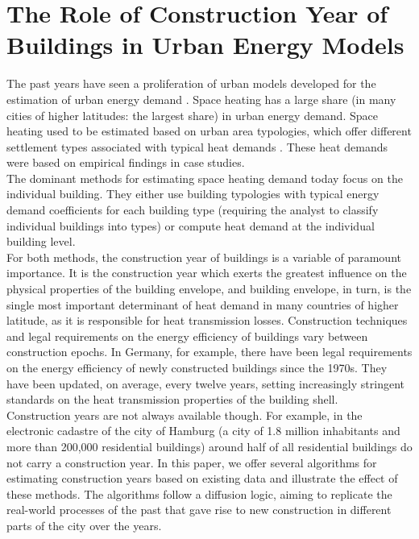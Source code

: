 \section{The Role of Construction Year of Buildings in Urban Energy Models}
 
The past years have seen a proliferation of urban models developed for the
estimation of urban energy demand
\cite{Calderon.2015,Mata.2014,MunozH.2014.IBPSA-JP,MunozH.2014.IJM,Chingcuanco.2012,Fracastoro.2011}.
Space heating has a large share (in many cities of higher latitudes: the
largest share) in urban energy demand. Space heating used to be estimated based
on urban area typologies, which offer different settlement types associated
with typical heat demands 
\cite{Roth.1980,Roth.1981,Blesl.2002,Everding.2004,Blesl.2007,Genske.2009,Erhorn.2011}.
These heat demands were based on empirical findings in case studies.\\
 
The dominant methods for estimating space heating demand today focus on the
individual building. They either use building typologies with typical energy
demand coefficients for each building type (requiring the analyst to classify
individual buildings into types) or compute heat demand at the individual
building level.\\
 
For both methods, the construction year of buildings is a variable of paramount
importance. It is the construction year which exerts the greatest influence on
the physical properties of the building envelope, and building envelope, in
turn, is the single most important determinant of heat demand in many countries
of higher latitude, as it is responsible for heat transmission losses.
Construction techniques and legal requirements on the energy efficiency of
buildings vary between construction epochs. In Germany, for example, there have
been legal requirements on the energy efficiency of newly constructed buildings
since the 1970s. They have been updated, on average, every twelve years,
setting increasingly stringent standards on the heat transmission properties of
the building shell.\\
 
Construction years are not always available though. For example, in the
electronic cadastre of the city of Hamburg (a city of 1.8 million inhabitants
and more than 200,000 residential buildings) around half of all residential buildings do not carry a
construction year. 
In this paper, we offer several algorithms for estimating
construction years based on existing data and illustrate the effect of these
methods. The algorithms follow a diffusion logic, aiming to replicate the
real-world processes of the past that gave rise to new construction in
different parts of the city over the years.\\

